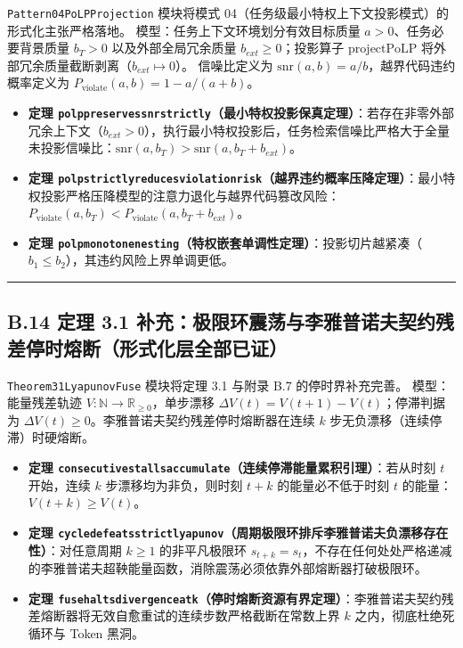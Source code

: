 \documentclass[
]{ctexart}
\providecommand{\tightlist}{%
  \setlength{\itemsep}{0pt}\setlength{\parskip}{0pt}}
\renewcommand{\_}{\discretionary{}{}{\textunderscore}}
\begin{document}
\texttt{Pattern04\_PoLPProjection} 模块将模式
04（任务级最小特权上下文投影模式）的形式化主张严格落地。
模型：任务上下文环境划分有效目标质量 \(a>0\)、任务必要背景质量 \(b_T>0\)
以及外部全局冗余质量 \(b_{ext}\ge0\)；投影算子 \(\mathrm{projectPoLP}\)
将外部冗余质量截断剥离（\(b_{ext}\mapsto 0\)）。 信噪比定义为
\(\mathrm{snr}(a, b) = a/b\)，越界代码违约概率定义为
\(P_{\mathrm{violate}}(a, b) = 1 - a/(a+b)\)。

\begin{itemize}
\tightlist
\item
  \textbf{定理
  \texttt{polp\_preserves\_snr\_strictly}（最小特权投影保真定理）}：若存在非零外部冗余上下文（\(b_{ext}>0\)），执行最小特权投影后，任务检索信噪比严格大于全量未投影信噪比：\(\mathrm{snr}(a, b_T) > \mathrm{snr}(a, b_T + b_{ext})\)。
\item
  \textbf{定理
  \texttt{polp\_strictly\_reduces\_violation\_risk}（越界违约概率压降定理）}：最小特权投影严格压降模型的注意力退化与越界代码篡改风险：\(P_{\mathrm{violate}}(a, b_T) < P_{\mathrm{violate}}(a, b_T + b_{ext})\)。
\item
  \textbf{定理
  \texttt{polp\_monotone\_nesting}（特权嵌套单调性定理）}：投影切片越紧凑（\(b_1 \le b_2\)），其违约风险上界单调更低。
\end{itemize}

\begin{center}\rule{0.5\linewidth}{0.5pt}\end{center}

\subsection{B.14 定理 3.1
补充：极限环震荡与李雅普诺夫契约残差停时熔断（形式化层全部已证）}\label{b.14-ux5b9aux7406-3.1-ux8865ux5145ux6781ux9650ux73afux9707ux8361ux4e0eux674eux96c5ux666eux8bfaux592bux5951ux7ea6ux6b8bux5deeux505cux65f6ux7194ux65adux5f62ux5f0fux5316ux5c42ux5168ux90e8ux5df2ux8bc1}

\texttt{Theorem3\_1\_LyapunovFuse} 模块将定理 3.1 与附录 B.7
的停时界补充完善。 模型：能量残差轨迹
\(V: \mathbb{N} \to \mathbb{R}_{\ge 0}\)，单步漂移
\(\Delta V(t) = V(t+1) - V(t)\)；停滞判据为
\(\Delta V(t) \ge 0\)。李雅普诺夫契约残差停时熔断器在连续 \(k\)
步无负漂移（连续停滞）时硬熔断。

\begin{itemize}
\tightlist
\item
  \textbf{定理
  \texttt{consecutive\_stalls\_accumulate}（连续停滞能量累积引理）}：若从时刻
  \(t\) 开始，连续 \(k\) 步漂移均为非负，则时刻 \(t+k\)
  的能量必不低于时刻 \(t\) 的能量：\(V(t+k) \ge V(t)\)。
\item
  \textbf{定理
  \texttt{cycle\_defeats\_strict\_lyapunov}（周期极限环排斥李雅普诺夫负漂移存在性）}：对任意周期
  \(k\ge 1\) 的非平凡极限环
  \(s_{t+k} = s_t\)，不存在任何处处严格递减的李雅普诺夫超鞅能量函数，消除震荡必须依靠外部熔断器打破极限环。
\item
  \textbf{定理
  \texttt{fuse\_halts\_divergence\_at\_k}（停时熔断资源有界定理）}：李雅普诺夫契约残差熔断器将无效自愈重试的连续步数严格截断在常数上界
  \(k\) 之内，彻底杜绝死循环与 Token 黑洞。
\end{itemize}
\end{document}
